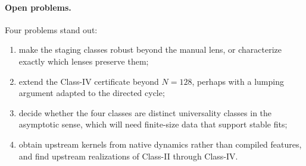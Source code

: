 \paragraph{Open problems.} Four problems stand out:
\begin{enumerate}
  \item make the staging classes robust beyond the manual lens, or characterize exactly which lenses preserve them;
  \item extend the Class-IV certificate beyond $N=128$, perhaps with a lumping argument adapted to the directed cycle;
  \item decide whether the four classes are distinct universality classes in the asymptotic sense, which will need finite-size data that support stable fits;
  \item obtain upstream kernels from native dynamics rather than compiled features, and find upstream realizations of Class-II through Class-IV.
\end{enumerate}
